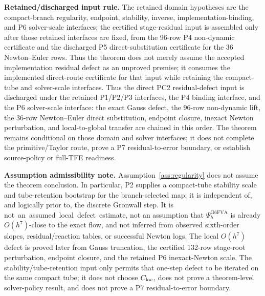 \documentclass[preprint,12pt]{elsarticle}
\newcommand{\tfe}{TFE}
\begin{document}
\noindent\textbf{Retained/discharged input rule.}
The retained domain
hypotheses are the compact-branch regularity, endpoint, stability, inverse,
implementation-binding, and P6 solver-scale interfaces; the certified
stage-residual input is assembled only after those retained interfaces are
fixed, from the 96-row P4 non-dynamic certificate and the discharged P5
direct-substitution certificate for the 36 Newton--Euler rows. Thus the
theorem does not merely assume the accepted implementation residual defect as
an unproved premise; it consumes the implemented direct-route certificate for
that input while retaining the compact-tube and solver-scale interfaces.
Thus the direct PC2 residual-defect input is discharged under the retained
P1/P2/P3 interfaces, the P4 binding interface, and the P6 solver-scale
interface: the exact Gauss defect, the 96-row non-dynamic lift, the 36-row
Newton--Euler direct substitution, endpoint closure, inexact Newton
perturbation, and local-to-global transfer are chained in this order. The
theorem remains conditional on those domain and solver interfaces; it does
not complete the primitive/Taylor route, prove a P7 residual-to-error boundary,
or establish source-policy or full-\tfe{} readiness.

\noindent\textbf{Assumption admissibility note.}
Assumption~\ref{ass:regularity}
does not assume the theorem conclusion.  In particular, P2 supplies a
compact-tube stability scale and tube-retention bootstrap for the
branch-selected map; it is independent of, and logically prior to, the
discrete Gronwall step.  It is \mbox{not an assumed local defect estimate}, not an
assumption that \(\Psi_h^{\mathrm{G6FVA}}\) is already \(O(h^7)\)-close to
the exact flow, and not inferred from observed sixth-order slopes,
residual/reaction tables, or successful Newton logs.  The local \(O(h^7)\)
defect is proved later from Gauss truncation, the certified 132-row
stage-root perturbation, endpoint closure, and the retained P6 inexact-Newton
scale.  The stability/tube-retention input only permits that one-step defect
to be iterated on the same compact tube; it does not choose \(C_{\rm loc}\),
does not prove a theorem-level solver-policy result, and does not prove a
P7 residual-to-error boundary.
\end{document}
